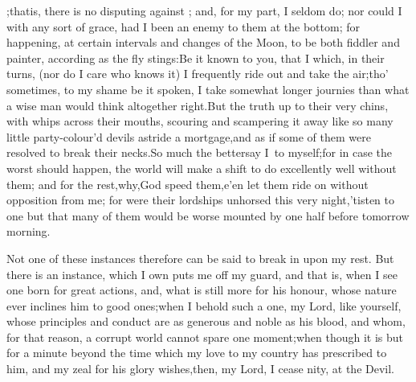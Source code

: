 \documentclass{article}
\begin{document}
\enspace\tsk {};\tsk that\break is, there is no disputing against
; and, for my part, I seldom do; 
nor could I with any sort of grace, had 
I been an enemy to them at the bottom; 
for happening, at certain intervals 
and changes of the Moon, to be both
fiddler and painter, according as the fly
stings:\tsk Be it known to you, that I
which, in their turns, (nor do I care who knows
it) I frequently ride out and take 
the air;\tsk tho’ sometimes, to my shame\break
be it spoken, I take somewhat longer\break
journies than what a wise man would\break
think altogether right.\tsk But the truth\break
{}
up to their very chins, with whips across 
their mouths, scouring and
scampering it away like so many little party-colour’d devils
astride a mortgage,\tsh and as if\break
some of them were resolved to break\break
their necks.\tsh So much the better\tsk say\break
I~to myself;\tsk for in case the worst should happen, the world will
make a shift to do excellently well without them; and for the
rest,\tsh why,\tsh God speed
them,\tsk e’en let them ride on without opposition
from me; for were their lordships unhorsed this very
night,\tsk ’tis\break ten to one but that many of them would
be worse mounted by one half before tomorrow
morning.

Not one of these instances therefore can be said to break in upon my rest.\tsk\break
But there is an instance, which I own puts me off my guard, and that is, when I see
one born for great actions, and, what is still more for his honour,
whose nature ever inclines him to good ones;\tsh\break when I behold such a one, my
Lord, like yourself, whose principles and conduct are as generous and noble as his
blood, and whom, for that reason, a corrupt world cannot spare one moment;\tsk when
 though it is but for a minute beyond the
time which my love to my country has prescribed to him, and my zeal for his glory
wishes,\tsk then, my Lord, I cease
nity, at the Devil.
\end{document}
